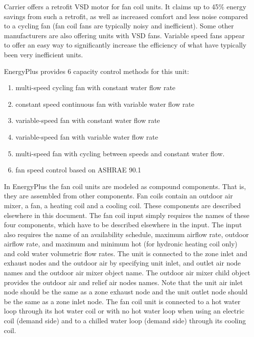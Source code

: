 Carrier offers a retrofit VSD motor for fan coil units. It claims up to 45\% energy savings from such a retrofit, as well as increased comfort and less noise compared to a cycling fan (fan coil fans are typically noisy and inefficient). Some other manufacturers are also offering units with VSD fans. Variable speed fans appear to offer an easy way to significantly increase the efficiency of what have typically been very inefficient units.

EnergyPlus provides 6 capacity control methods for this unit:

\begin{enumerate}
\def\labelenumi{\arabic{enumi}.}
\item
  multi-speed cycling fan with constant water flow rate
\item
  constant speed continuous fan with variable water flow rate
\item
  variable-speed fan with constant water flow rate
\item
  variable-speed fan with variable water flow rate
\item
  multi-speed fan with cycling between speeds and constant water flow.
\item
  fan speed control based on ASHRAE 90.1
\end{enumerate}

In EnergyPlus the fan coil units are modeled as compound components. That is, they are assembled from other components. Fan coils contain an outdoor air mixer, a fan, a heating coil and a cooling coil. These components are described elsewhere in this document. The fan coil input simply requires the names of these four components, which have to be described elsewhere in the input. The input also requires the name of an availability schedule, maximum airflow rate, outdoor airflow rate, and maximum and minimum hot (for hydronic heating coil only) and cold water volumetric flow rates. The unit is connected to the zone inlet and exhaust nodes and the outdoor air by specifying unit inlet, and outlet air node names and the outdoor air mixer object name. The outdoor air mixer child object provides the outdoor air and relief air nodes names. Note that the unit air inlet node should be the same as a zone exhaust node and the unit outlet node should be the same as a zone inlet node. The fan coil unit is connected to a hot water loop through its hot water coil or with no hot water loop when using an electric coil (demand side) and to a chilled water loop (demand side) through its cooling coil.

